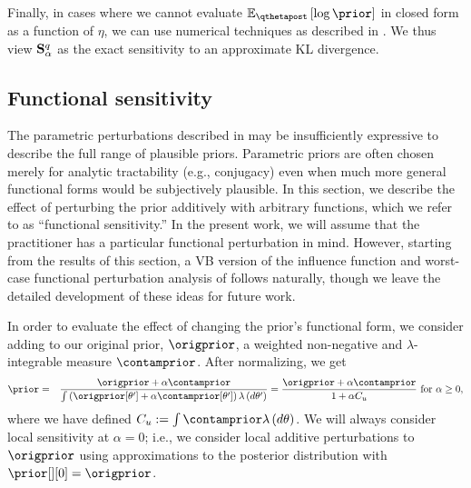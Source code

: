 \documentclass{article}\usepackage[]{graphicx}\usepackage[]{color}
\theoremstyle{plain}
\theoremstyle{definition}
\theoremstyle{plain}
\theoremstyle{plain}
\theoremstyle{plain}
\theoremstyle{plain}
\begin{document}
Finally, in cases where we cannot evaluate $\mbeq\left[\log\prior\right]$
in closed form as a function of $\eta$, we can use numerical techniques
as described in . We thus view
$\mathbf{S}_{\alpha}^{q}$ as the exact sensitivity to an approximate KL divergence.

\subsection{Functional sensitivity\label{subsec:functional_sensitivity}}

The parametric perturbations described in 
may be insufficiently expressive to describe the full range of plausible
priors. Parametric priors are often chosen merely for analytic tractability
(e.g., conjugacy) even when much more general functional forms would
be subjectively plausible. In this section, we describe the effect
of perturbing the prior additively with arbitrary functions, which
we refer to as ``functional sensitivity.'' In the present work,
we will assume that the practitioner has a particular functional perturbation
in mind. However, starting from the results of this section, a VB
version of the influence function and worst-case functional perturbation
analysis of \citet{gustafson:1996:localposterior} follows naturally,
though we leave the detailed development of these ideas for future
work.

In order to evaluate the effect of changing the prior's functional
form, we consider adding to our original prior, $\origprior$, a weighted
non-negative and $\lambda$-integrable measure $\contamprior$. After
normalizing, we get
\begin{eqnarray}
\prior & = & \frac{\origprior+\alpha\contamprior}{\int\left(\origprior[\theta']+\alpha\contamprior[\theta']\right)\lambda\left(d\theta'\right)}=\frac{\origprior+\alpha\contamprior}{1+\alpha\contamnorm}\textrm{ for }\alpha\ge0,\label{eq:u_contamination}
\end{eqnarray}
where we have defined $\contamnorm:=\int\contamprior\lambda\left(d\theta\right)$.
We will always consider local sensitivity at $\alpha=0$; i.e., we
consider local additive perturbations to $\origprior$ using approximations
to the posterior distribution with $\prior[][0]=\origprior$. 
\end{document}
